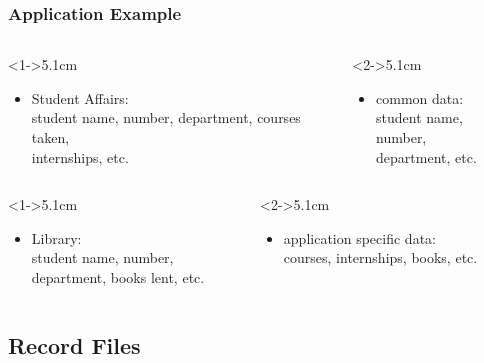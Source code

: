 \documentclass[dvipsnames]{beamer}
\theoremstyle{plain}
\begin{document}
\begin{frame}
  \frametitle{Application Example}

  \begin{example}
    \begin{columns}[t]
      \begin{column}<1->{5.1cm}
      \begin{itemize}
        \item Student Affairs:\\
          student name, number,
          department, courses taken,\\
          internships, etc.
      \end{itemize}
      \end{column}

      \begin{column}<2->{5.1cm}
      \begin{itemize}
        \item common data:\\
          student name, number,\\
          department, etc.
      \end{itemize}
      \end{column}
    \end{columns}

    \begin{columns}[t]
      \begin{column}<1->{5.1cm}
      \begin{itemize}
        \item Library:\\
          student name, number,\\
          department, books lent, etc.
      \end{itemize}
      \end{column}

      \begin{column}<2->{5.1cm}
      \begin{itemize}
        \item application specific data:\\
          courses, internships, books, etc.
      \end{itemize}
      \end{column}
    \end{columns}
  \end{example}
\end{frame}

\subsection{Record Files}
\end{document}
